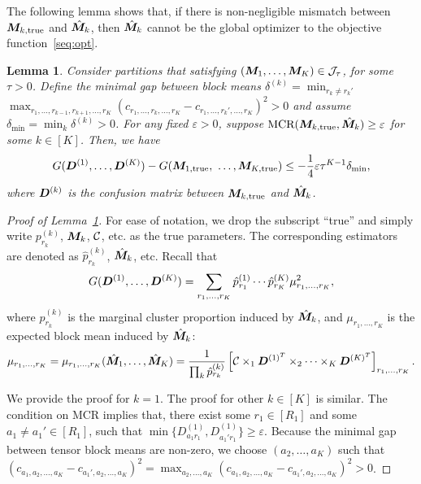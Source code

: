 \documentclass{article}
\newtheorem{lemma}{Lemma}
\begin{document}
\begin{appendices}
\begin{enumerate}
\end{enumerate}

The following lemma shows that, if there is non-negligible mismatch between $\bm M_{k,\text{true}}$ and $\hat {\bm M}_k$, then $\hat {\bm M}_k$ cannot be the global optimizer to the objective function~\eqref{seq:opt}.

\begin{lemma}\label{1}
Consider partitions that satisfying $(\bm M_1,\ldots,\bm M_K)\in \mathcal{J}_\tau$, for some $\tau>0$. 
Define the minimal gap between block means $\delta^{(k)}=\min_{r_k\neq r_k'}$ $\max_{r_1,\ldots,r_{k-1},r_{k+1},\ldots,r_K}(c_{r_1,\ldots,r_k,\ldots,r_K}-c_{r_1,\ldots,r_k',\ldots,r_K})^2>0$ and assume $\delta_{\min}=\min_k\delta^{(k)}>0$. For any fixed $\varepsilon>0$, suppose $\text{MCR}(\bm M_{k,\text{true}}, \hat {\bm M}_k)\geq \varepsilon $ for some $k\in[K]$. Then, we have
\begin{equation*}
    G(\mD^{(1)},\ldots,\mD^{(K)})-G(\mM_{1,\text{true}},\ \ldots,\mM_{K,\text{true}}) \leq -\frac{1}{4}\varepsilon\tau^{K-1}\delta_{\min},
\end{equation*}
where $\bm{D}^{(k)}$ is the confusion matrix between $\bm M_{k,\text{true}}$ and $\hat {\bm M}_k$.
\end{lemma}

\begin{proof}[Proof of Lemma~\ref{1}]
For ease of notation, we drop the subscript ``true'' and simply write $p^{(k)}_{r_k}$, $\bm M_k$, $\mathcal{C}$, etc. as the true parameters. The corresponding estimators are denoted as $\hat p^{(k)}_{r_k}$, $\hat {\bm M}_k$, etc.
Recall that 
\begin{equation}\label{eq:D}
G(\bm{D}^{(1)},\ldots,\bm{D}^{(K)})=\sum_{r_1,\ldots,r_K} \hat p^{(1)}_{r_1}\cdots \hat p^{(K)}_{r_K}  \mu^2_{r_1,\ldots,r_K},
\end{equation}
where  $\hat p^{(k)}_{r_k}$ is the marginal cluster proportion induced by $\hat{\bm M}_k$, and $\mu_{r_1,\ldots,r_K}$ is the expected block mean induced by $\hat{\bm M}_k$:
\[
\mu_{r_1,\ldots,r_K}=\mu_{r_1,\ldots,r_K}(\hat{\bm M}_1,\ldots,\hat{\bm M}_K)={1\over \prod_k \hat p^{(k)}_{r_k}}\left[ \mathcal{C}\times_1 \bm{D}^{(1)^T} \times_2\cdots\times_K \bm{D}^{(K)^T}\right]_{r_1,\ldots,r_K}.
\]


We provide the proof for $k=1$. The proof for other $k\in[K]$ is similar. The condition on MCR implies that, there exist some $r_1\in[R_1]$ and some $a_1\neq a_1'\in[R_1]$, such that $\min\{D_{a_1r_1}^{(1)}, D_{a_1'r_1}^{(1)}\}\geq \varepsilon$. Because the minimal gap between tensor block means are non-zero, we choose $(a_2,\ldots,a_K)$ such that $(c_{a_1,a_2,\ldots,a_K}-c_{a_1',a_2,\ldots,a_K})^2 = \displaystyle\max_{a_2,\ldots,a_K}(c_{a_1,a_2,\ldots,a_K}-c_{a_1',a_2,\ldots,a_K})^2>0$. 


\end{proof}
\end{appendices}
\end{document}
